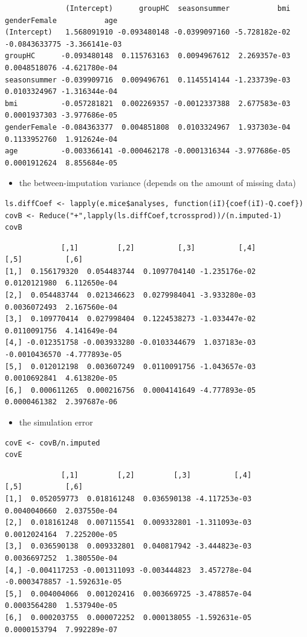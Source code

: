 \documentclass[12pt]{article}
\begin{document}
\begin{verbatim}
              (Intercept)      groupHC  seasonsummer           bmi  genderFemale           age
(Intercept)   1.568091910 -0.093480148 -0.0399097160 -5.728182e-02 -0.0843633775 -3.366141e-03
groupHC      -0.093480148  0.115763163  0.0094967612  2.269357e-03  0.0048518076 -4.621780e-04
seasonsummer -0.039909716  0.009496761  0.1145514144 -1.233739e-03  0.0103324967 -1.316344e-04
bmi          -0.057281821  0.002269357 -0.0012337388  2.677583e-03  0.0001937303 -3.977686e-05
genderFemale -0.084363377  0.004851808  0.0103324967  1.937303e-04  0.1133952760  1.912624e-04
age          -0.003366141 -0.000462178 -0.0001316344 -3.977686e-05  0.0001912624  8.855684e-05
\end{verbatim}

\begin{itemize}
\item the between-imputation variance (depends on the amount of missing data)
\end{itemize}
\lstset{language=r,label= ,caption= ,captionpos=b,numbers=none}
\begin{lstlisting}
ls.diffCoef <- lapply(e.mice$analyses, function(iI){coef(iI)-Q.coef})
covB <- Reduce("+",lapply(ls.diffCoef,tcrossprod))/(n.imputed-1)
covB
\end{lstlisting}

\begin{verbatim}
             [,1]         [,2]          [,3]          [,4]          [,5]          [,6]
[1,]  0.156179320  0.054483744  0.1097704140 -1.235176e-02  0.0120121980  6.112650e-04
[2,]  0.054483744  0.021346623  0.0279984041 -3.933280e-03  0.0036072493  2.167560e-04
[3,]  0.109770414  0.027998404  0.1224538273 -1.033447e-02  0.0110091756  4.141649e-04
[4,] -0.012351758 -0.003933280 -0.0103344679  1.037183e-03 -0.0010436570 -4.777893e-05
[5,]  0.012012198  0.003607249  0.0110091756 -1.043657e-03  0.0010692841  4.613820e-05
[6,]  0.000611265  0.000216756  0.0004141649 -4.777893e-05  0.0000461382  2.397687e-06
\end{verbatim}

\begin{itemize}
\item the simulation error
\end{itemize}
\lstset{language=r,label= ,caption= ,captionpos=b,numbers=none}
\begin{lstlisting}
covE <- covB/n.imputed
covE
\end{lstlisting}

\begin{verbatim}
             [,1]         [,2]         [,3]          [,4]          [,5]          [,6]
[1,]  0.052059773  0.018161248  0.036590138 -4.117253e-03  0.0040040660  2.037550e-04
[2,]  0.018161248  0.007115541  0.009332801 -1.311093e-03  0.0012024164  7.225200e-05
[3,]  0.036590138  0.009332801  0.040817942 -3.444823e-03  0.0036697252  1.380550e-04
[4,] -0.004117253 -0.001311093 -0.003444823  3.457278e-04 -0.0003478857 -1.592631e-05
[5,]  0.004004066  0.001202416  0.003669725 -3.478857e-04  0.0003564280  1.537940e-05
[6,]  0.000203755  0.000072252  0.000138055 -1.592631e-05  0.0000153794  7.992289e-07
\end{verbatim}
\end{document}
